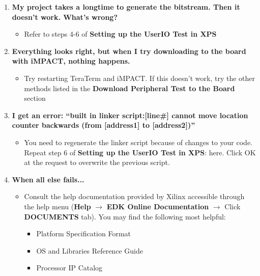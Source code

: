 \begin{enumerate}
\begin{itemize}
				\end{itemize}
			\item \textbf{My project takes a longtime to generate the bitstream. Then it doesn't work. What's wrong?}
				\begin{itemize}
					\item Refer to steps 4-6 of \textbf{Setting up the UserIO Test in XPS}
				\end{itemize}
			\item \textbf{Everything looks right, but when I try downloading to the board with iMPACT, nothing happens.}
				\begin{itemize}
					\item Try restarting TeraTerm and iMPACT. If this doesn't work, try the other methods listed in the \textbf{Download Peripheral Test to the Board} section
				\end{itemize}
			\item \textbf{I get an error: ``built in linker script:[line\#] cannot move location counter backwards (from [address1] to [address2])''}
				\begin{itemize}
					\item You need to regenerate the linker script because of changes to your code. Repeat step 6 of \textbf{Setting up the UserIO Test in XPS}: here. Click OK at the request to overwrite the previous script.
				\end{itemize}
			\item \textbf{When all else fails...}
				\begin{itemize}
					\item Consult the help documentation provided by Xilinx accessible through the help menu (\textbf{Help} $\rightarrow$ \textbf{EDK Online Documentation} $\rightarrow$ Click \textbf{DOCUMENTS} tab). You may find the following most helpful:
						\begin{itemize}
							\item Platform Specification Format
							\item OS and Libraries Reference Guide
							\item Processor IP Catalog
						\end{itemize}
				\end{itemize}
		\end{enumerate}